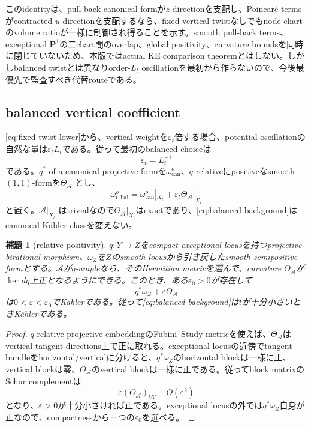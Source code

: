 \documentclass[11pt,a4paper]{ltjsarticle}
\newtheorem{lemma}[theorem]{補題}
\theoremstyle{definition}
\theoremstyle{remark}
\newcommand{\PP}{\mathbf P}
\newcommand{\eps}{\varepsilon}
\begin{document}
このidentityは、pull-back canonical formが$z$-directionを支配し、Poincaré termsがcontracted $u$-directionを支配するなら、fixed vertical twistなしでもnode chartのvolume ratioが一様に制御され得ることを示す。smooth pull-back terms、exceptional $\PP^1$の二chart間のoverlap、global positivity、curvature boundsを同時に閉じていないため、本版ではactual KE comparison theoremとはしない。しかしbalanced twistとは異なりorder-$L_t$ oscillationを最初から作らないので、今後最優先で監査すべき代替routeである。

\subsection{balanced vertical coefficient}

\eqref{eq:fixed-twist-lower}から、vertical weightを$\eps_t$倍する場合、potential oscillationの自然な量は$\eps_tL_t$である。従って最初のbalanced choiceは
\begin{equation}\label{eq:balanced-epsilon}
 \eps_t=L_t^{-1}
\end{equation}
である。$q^*$ of a canonical projective formを$\omega_{\mathrm{can}}^o$、$q$-relativeにpositiveなsmooth $(1,1)$-formを$\Theta_{\mathcal A}$ とし、
\begin{equation}\label{eq:balanced-background}
 \omega_{t,\mathrm{bal}}^o
 =\omega_{\mathrm{can}}^o|_{X_t}+\eps_t\Theta_{\mathcal A}|_{X_t}
\end{equation}
と置く。$\mathcal A|_{X_t}$ はtrivialなので$\Theta_{\mathcal A}|_{X_t}$はexactであり、\eqref{eq:balanced-background}はcanonical Kähler classを変えない。

\begin{lemma}[relative positivity]\label{lem:balanced-positivity}
$q:Y\to Z$をcompact exceptional locusを持つprojective birational morphism、$\omega_Z$を$Z$のsmooth locusから引き戻したsmooth semipositive formとする。$\mathcal A$が$q$-ampleなら、そのHermitian metricを選んで、curvature $\Theta_{\mathcal A}$が$\ker dq$上正となるようにできる。このとき、ある$\eps_0>0$が存在して
\[
 q^*\omega_Z+\eps\Theta_{\mathcal A}
\]
は$0<\eps<\eps_0$でKählerである。従って\eqref{eq:balanced-background}は$t$が十分小さいときKählerである。
\end{lemma}

\begin{proof}
$q$-relative projective embeddingのFubini--Study metricを使えば、$\Theta_{\mathcal A}$はvertical tangent directions上で正に取れる。exceptional locusの近傍でtangent bundleをhorizontal/verticalに分けると、$q^*\omega_Z$のhorizontal blockは一様に正、vertical blockは零、$\Theta_{\mathcal A}$のvertical blockは一様に正である。従ってblock matrixのSchur complementは
\[
 \eps(\Theta_{\mathcal A})_{VV}-O(\eps^2)
\]
となり、$\eps>0$が十分小さければ正である。exceptional locusの外では$q^*\omega_Z$自身が正なので、compactnessから一つの$\eps_0$を選べる。
\end{proof}
\end{document}
